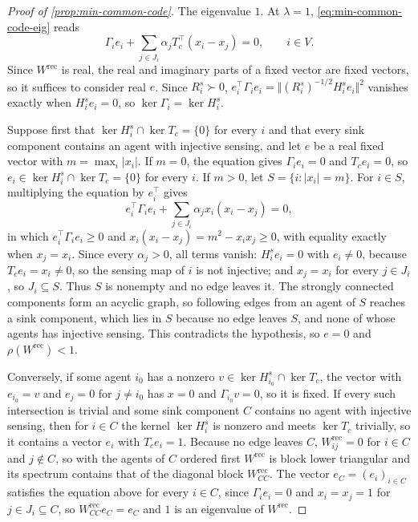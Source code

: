 \begin{proof}[Proof of \cref{prop:min-common-code}]
The eigenvalue $1$. At $\lambda=1$, \eqref{eq:min-common-code-eig} reads
\[
\Gamma_ie_i+\sum_{j\in J_i}\alpha_jT_c^\top(x_i-x_j)=0,\qquad i\in V.
\]
Since $W^{\mathrm{rec}}$ is real, the real and imaginary parts of a fixed vector are fixed vectors, so it suffices to consider real $e$. Since $R^s_i\succ0$, $e_i^\top\Gamma_ie_i=\Vert(R^s_i)^{-1/2}H^s_ie_i\Vert^2$ vanishes exactly when $H^s_ie_i=0$, so $\ker\Gamma_i=\ker H^s_i$.

Suppose first that $\ker H^s_i\cap\ker T_c=\{0\}$ for every $i$ and that every sink component contains an agent with injective sensing, and let $e$ be a real fixed vector with $m=\max_i\lvert x_i\rvert$. If $m=0$, the equation gives $\Gamma_ie_i=0$ and $T_ce_i=0$, so $e_i\in\ker H^s_i\cap\ker T_c=\{0\}$ for every $i$. If $m>0$, let $S=\{i:\lvert x_i\rvert=m\}$. For $i\in S$, multiplying the equation by $e_i^\top$ gives
\[
e_i^\top\Gamma_ie_i+\sum_{j\in J_i}\alpha_jx_i(x_i-x_j)=0,
\]
in which $e_i^\top\Gamma_ie_i\ge0$ and $x_i(x_i-x_j)=m^2-x_ix_j\ge0$, with equality exactly when $x_j=x_i$. Since every $\alpha_j>0$, all terms vanish: $H^s_ie_i=0$ with $e_i\neq0$, because $T_ce_i=x_i\neq0$, so the sensing map of $i$ is not injective; and $x_j=x_i$ for every $j\in J_i$, so $J_i\subseteq S$. Thus $S$ is nonempty and no edge leaves it. The strongly connected components form an acyclic graph, so following edges from an agent of $S$ reaches a sink component, which lies in $S$ because no edge leaves $S$, and none of whose agents has injective sensing. This contradicts the hypothesis, so $e=0$ and $\rho(W^{\mathrm{rec}})<1$.

Conversely, if some agent $i_0$ has a nonzero $v\in\ker H^s_{i_0}\cap\ker T_c$, the vector with $e_{i_0}=v$ and $e_j=0$ for $j\neq i_0$ has $x=0$ and $\Gamma_{i_0}v=0$, so it is fixed. If every such intersection is trivial and some sink component $C$ contains no agent with injective sensing, then for $i\in C$ the kernel $\ker H^s_i$ is nonzero and meets $\ker T_c$ trivially, so it contains a vector $e_i$ with $T_ce_i=1$. Because no edge leaves $C$, $W^{\mathrm{rec}}_{ij}=0$ for $i\in C$ and $j\notin C$, so with the agents of $C$ ordered first $W^{\mathrm{rec}}$ is block lower triangular and its spectrum contains that of the diagonal block $W^{\mathrm{rec}}_{CC}$. The vector $e_C=(e_i)_{i\in C}$ satisfies the equation above for every $i\in C$, since $\Gamma_ie_i=0$ and $x_i=x_j=1$ for $j\in J_i\subseteq C$, so $W^{\mathrm{rec}}_{CC}e_C=e_C$ and $1$ is an eigenvalue of $W^{\mathrm{rec}}$.


\end{proof}
